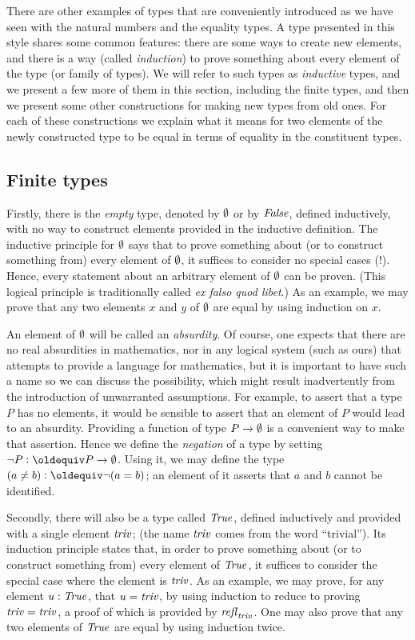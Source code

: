 There are other examples of types that are conveniently introduced as we have seen with the natural numbers and the equality types.  A type
presented in this style shares some common features: there are some ways to create new elements, and there is a way (called {\em induction}) to
prove something about every element of the type (or family of types).  We will refer to such types as {\em inductive} types, and we present a
few more of them in this section, including the finite types, and then we present some other constructions for making new types from old ones.
For each of these constructions we explain what it means for two elements of the newly constructed type to be equal in terms of equality in the
constituent types.

\subsection{Finite types}
\label{sec:finite-types}
Firstly, there is the {\em empty} type, denoted by $\emptyset$ or by $\mathop{\mathit{False}}$, defined inductively, with no way to construct elements provided in the inductive
definition.  The inductive principle for $\emptyset$ says that to prove something about (or to construct something from) every element of
$\emptyset$, it suffices to consider no special cases (!).  Hence, every statement about an arbitrary element of $\emptyset$ can be proven. (This logical principle is traditionally called {\em ex falso quod libet}.) As
an example, we may prove that any two elements $x$ and $y$ of $\emptyset$ are equal by using induction on $x$.

An element of $\emptyset$ will be called an \emph{absurdity}.  Of course, one expects that there are no real absurdities in mathematics, nor in any
logical system (such as ours) that attempts to provide a language for mathematics, but it is important to have such a name so we can discuss
the possibility, which might result inadvertently from the introduction of unwarranted assumptions.  For example, to assert that a type $P$ has
no elements, it would be sensible to assert that an element of $P$ would lead to an absurdity.  Providing a function of type $P \to \emptyset$ is a
convenient way to make that assertion.  Hence we define the {\em negation} of a type by setting $\neg P \defeq P \to \emptytype$.  Using it, we
may define the type $(a \ne b) \defeq \neg (a = b)$; an element of it asserts that $a$ and $b$ cannot be identified.

Secondly, there will also be a type called $\mathop{\mathit{True}}$, defined inductively and provided with a single element $\mathop{\mathit{triv}}$; (the name $\mathop{\mathit{triv}}$ comes from the word
  ``trivial'').  Its induction principle
states that, in order to prove something about (or to construct something from) every element of $\mathop{\mathit{True}}$, it suffices to consider the special
case where the element is $\mathop{\mathit{triv}}$.  As an example, we may prove, for any element $u : \mathop{\mathit{True}}$, that $u=\mathop{\mathit{triv}}$, by using induction to reduce
to proving $\mathop{\mathit{triv}}=\mathop{\mathit{triv}}$, a proof of which is provided by $\mathop{{\it refl}_{\mathop{\mathit{triv}}}}$.  One may also prove that any two elements of $\mathop{\mathit{True}}$ are equal by using induction twice.


